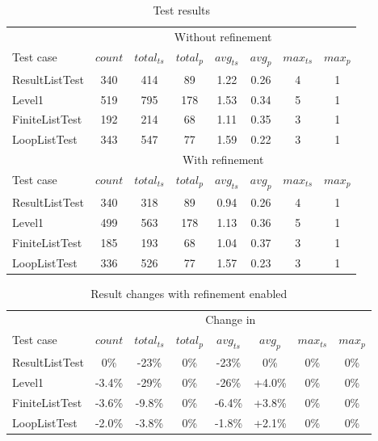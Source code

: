 \begin{table}[ht]
    \centering
    \begin{tabular}{l||c|c|c|c|c|c|c}
&\multicolumn{7}{c}{Without refinement} \\
         Test case & $\mathit{count}$ & $\mathit{total}_\mathit{ts}$ &  $\mathit{total}_\mathit{p}$ & $\mathit{avg}_{\mathit{ts}}$ & $\mathit{avg}_{\mathit{p}}$ & $\mathit{max}_{\mathit{ts}}$ & $\mathit{max}_{\mathit{p}}$ \\
         \hline
         ResultListTest & 340 & 414 & 89 & 1.22 & 0.26 & 4 & 1\\
         Level1 & 519 & 795 & 178 & 1.53 & 0.34 & 5 & 1 \\
         FiniteListTest & 192 & 214 & 68 & 1.11 & 0.35 & 3 & 1\\
         LoopListTest & 343 & 547 & 77 & 1.59 & 0.22 & 3 & 1  \\
         \hline \hline
         & \multicolumn{7}{c}{With refinement}\\
         Test case & $\mathit{count}$ & $\mathit{total}_\mathit{ts}$ &  $\mathit{total}_\mathit{p}$ & $\mathit{avg}_{\mathit{ts}}$ & $\mathit{avg}_{\mathit{p}}$ & $\mathit{max}_{\mathit{ts}}$ & $\mathit{max}_{\mathit{p}}$ \\
         \hline
         ResultListTest & 340 & 318 & 89 & 0.94 & 0.26 & 4 & 1\\
         Level1 & 499 & 563 & 178 & 1.13 & 0.36 & 5 & 1 \\
         FiniteListTest & 185 & 193 & 68 & 1.04 & 0.37 & 3 & 1\\
         LoopListTest & 336 & 526 & 77 & 1.57 & 0.23 & 3 & 1 
    \end{tabular}
    \caption{Test results}
    \label{tab:results}
\end{table}

\begin{table}[ht]
    \centering
    \begin{tabular}{l||c|c|c|c|c|c|c}
     & \multicolumn{7}{c}{Change in }\\
         Test case & $\mathit{count}$ & $\mathit{total}_\mathit{ts}$ &  $\mathit{total}_\mathit{p}$ & $\mathit{avg}_{\mathit{ts}}$ & $\mathit{avg}_{\mathit{p}}$ & $\mathit{max}_{\mathit{ts}}$ & $\mathit{max}_{\mathit{p}}$  \\
         \hline
         ResultListTest & 0\% & -23\% & 0\% & -23\% & 0\% & 0\% & 0\% \\
         Level1 & -3.4\% & -29\% & 0\% & -26\% & +4.0\% & 0\% & 0\% \\
         FiniteListTest & -3.6\% & -9.8\% & 0\% & -6.4\% & +3.8\% & 0\% & 0\% \\
         LoopListTest & -2.0\% & -3.8\% & 0\% & -1.8\% & +2.1\% & 0\% & 0\%
    \end{tabular}
    \caption{Result changes with refinement enabled}
    \label{tab:changes}
\end{table}


